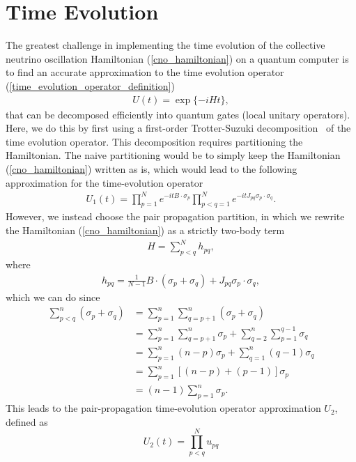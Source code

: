 \documentclass[Dual]{msu-thesis}
\begin{document}
\section{Time Evolution}
\label{sec:real_time}

The greatest challenge in implementing the time evolution of the collective neutrino oscillation Hamiltonian (\ref{cno_hamiltonian}) on a quantum computer is to find an accurate approximation to the time evolution operator (\ref{time_evolution_operator_definition})
\begin{align}
 U(t)=\exp\{-iHt\}  
,\end{align}
that can be decomposed efficiently into quantum gates (local unitary operators)\cite{Lloyd96}. Here, we do this by first using a first-order Trotter-Suzuki decomposition~\cite{Suzuki91} of the time evolution operator. This decomposition requires partitioning the Hamiltonian. The naive partitioning would be to simply keep the Hamiltonian (\ref{cno_hamiltonian}) written as is, which would lead to the following approximation for the time-evolution operator 
\begin{align}
\label{eq:trotter1}
U_1(t)=\prod_{p=1}^Ne^{-itB\cdot\sigma_p}\prod_{p<q=1}^Ne^{-it J_{pq}\sigma_p\cdot\sigma_q}
.\end{align}
However, we instead choose the pair propagation partition, in which we rewrite the Hamiltonian (\ref{cno_hamiltonian}) as a strictly two-body term
\begin{align}
\label{eq:ham_decomp}
H = \sum_{p<q}^N h_{pq}
,\end{align}
where
\begin{align}
h_{pq} = \frac{1}{N-1}B\cdot(\sigma_p+\sigma_q) + J_{pq}\sigma_p\cdot\sigma_q
,\end{align}
which we can do since
\begin{align}
\sum_{p<q}^n(\sigma_p+\sigma_q)
&=
\sum_{p=1}^n\sum_{q=p+1}^n(\sigma_p+\sigma_q) 
\nonumber 
\\
&=
\sum_{p=1}^n\sum_{q=p+1}^n\sigma_p+\sum_{q=2}^n\sum_{p=1}^{q-1}\sigma_q
\nonumber 
\\
&=
\sum_{p=1}^n(n-p)\sigma_p+\sum_{q=1}^n(q-1)\sigma_q
\nonumber 
\\
&=
\sum_{p=1}^n\left[(n-p)+(p-1)\right]\sigma_p 
\nonumber 
\\
&=(n-1)\sum_{p=1}^n\sigma_p
.\end{align}
This leads to the pair-propagation time-evolution operator approximation $U_2$, defined as
\begin{equation}
\label{eq:pair_prop_app}
U_2(t) = \prod_{p<q}^N u_{pq}
\end{equation}
\end{document}

